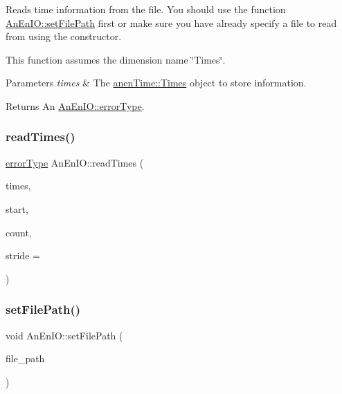 Reads time information from the file. You should use the function \mbox{\hyperlink{class_an_en_i_o_a98066d375cc78694fda2af1ce37cc8d8}{An\+En\+I\+O\+::set\+File\+Path}} first or make sure you have already specify a file to read from using the constructor.

This function assumes the dimension name \char`\"{}\+Times\char`\"{}.


\begin{DoxyParams}{Parameters}
{\em times} & The \mbox{\hyperlink{classanen_time_1_1_times}{anen\+Time\+::\+Times}} object to store information. \\
\hline
\end{DoxyParams}
\begin{DoxyReturn}{Returns}
An \mbox{\hyperlink{class_an_en_i_o_aa56bc1ec6610b86db4349bce20f9ead0}{An\+En\+I\+O\+::error\+Type}}. 
\end{DoxyReturn}
\mbox{\label{class_an_en_i_o_aecbace06ce451ccad367d0150ef6aaf9}} 
\subsubsection{\texorpdfstring{read\+Times()}{readTimes()}\hspace{0.1cm}{\footnotesize\ttfamily [2/2]}}
{\footnotesize\ttfamily \mbox{\hyperlink{class_an_en_i_o_aa56bc1ec6610b86db4349bce20f9ead0}{error\+Type}} An\+En\+I\+O\+::read\+Times (\begin{DoxyParamCaption}\item[{\mbox{\hyperlink{classanen_time_1_1_times}{anen\+Time\+::\+Times}} \&}]{times,  }\item[{size\+\_\+t}]{start,  }\item[{size\+\_\+t}]{count,  }\item[{ptrdiff\+\_\+t}]{stride = {} }\end{DoxyParamCaption})}

\mbox{\label{class_an_en_i_o_a98066d375cc78694fda2af1ce37cc8d8}} 
\subsubsection{\texorpdfstring{set\+File\+Path()}{setFilePath()}}
{\footnotesize\ttfamily void An\+En\+I\+O\+::set\+File\+Path (\begin{DoxyParamCaption}\item[{std\+::string}]{file\+\_\+path }\end{DoxyParamCaption})}

